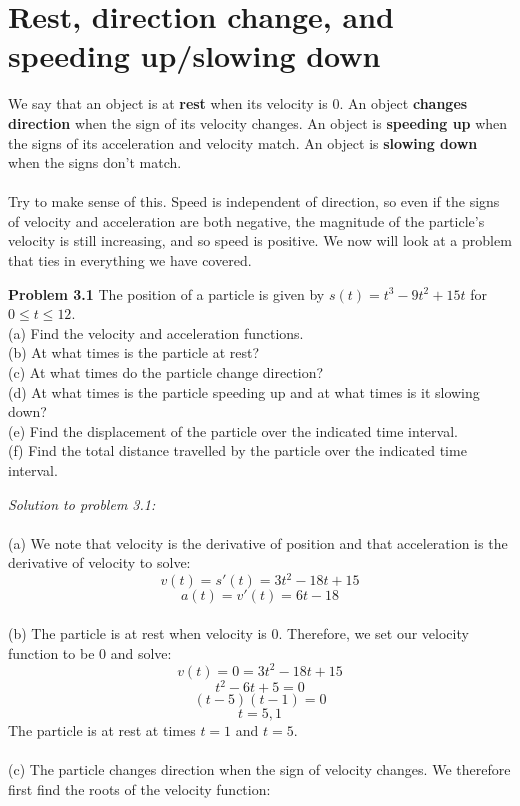 \documentclass[11pt]{scrartcl}
\begin{document}
\section{Rest, direction change, and speeding up/slowing down}
\noindent 
We say that an object is at \textbf{rest} when its velocity is 0. An object \textbf{changes direction} when the sign of its velocity changes. An object is \textbf{speeding up} when the signs of its acceleration and velocity match. An object is \textbf{slowing down} when the signs don't match. \\
\\
\noindent 
Try to make sense of this. Speed is independent of direction, so even if the signs of velocity and acceleration are both negative, the magnitude of the particle's velocity is still increasing, and so speed is positive. We now will look at a problem that ties in everything we have covered. 
\begin{tcolorbox}
[colback=purple!5!white,colframe=purple!75!black]
\textbf{Problem 3.1} The position of a particle is given by $s(t)=t^3-9t^2+15t$ for $0 \leq t \leq 12$. \\
\noindent 
(a) Find the velocity and acceleration functions. \\
\noindent 
(b) At what times is the particle at rest? \\
\noindent 
(c) At what times do the particle change direction? \\
\noindent 
(d) At what times is the particle speeding up and at what times is it slowing down? \\
\noindent 
(e) Find the displacement of the particle over the indicated time interval. \\
\noindent 
(f) Find the total distance travelled by the particle over the indicated time interval. 
\end{tcolorbox}
\noindent
\textit{Solution to problem 3.1:} \\
\\
\noindent 
(a) We note that velocity is the derivative of position and that acceleration is the derivative of velocity to solve: 
$$v(t)=s'(t)=3t^2-18t+15$$
$$a(t)=v'(t)=6t-18$$\\
\noindent 
(b) The particle is at rest when velocity is 0. Therefore, we set our velocity function to be 0 and solve: 
$$v(t)=0=3t^2-18t+15$$
$$t^2-6t+5=0$$
$$(t-5)(t-1)=0$$
$$t=5, 1$$
The particle is at rest at times $t=1$ and $t=5$.\\
\\
\noindent 
(c) The particle changes direction when the sign of velocity changes. We therefore first find the roots of the velocity function:
\end{document}
